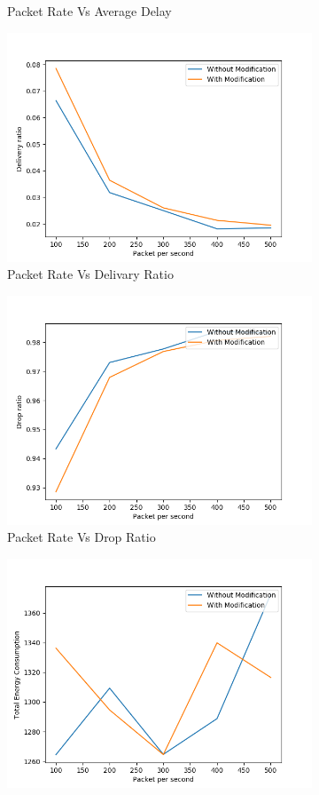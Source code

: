 \begin{figure}[h]
\begin{subfigure}{.5\textwidth}
    \caption{Packet Rate Vs Average Delay}
     \label{packet_rate_delay_modified}
\end{subfigure}
\begin{subfigure}{.5\textwidth}
  \centering
  \includegraphics[width=.8\linewidth]{modified_fig/PacketpersecondvsDeliveryRatio.png}
     \caption{Packet Rate Vs Delivary Ratio}
     \label{packet_rate_delivery_modified}
\end{subfigure}
\begin{subfigure}{.5\textwidth}
  \centering
  \includegraphics[width=.8\linewidth]{modified_fig/PacketpersecondvsDropRatio.png}
     \caption{Packet Rate Vs Drop Ratio}
     \label{packet_rate_drop_modified}
\end{subfigure}
\begin{subfigure}{.5\textwidth}
  \centering
  \includegraphics[width=.8\linewidth]{modified_fig/PacketpersecondvsTotalEnergyConsumption.png}

\end{subfigure}
\end{figure}

